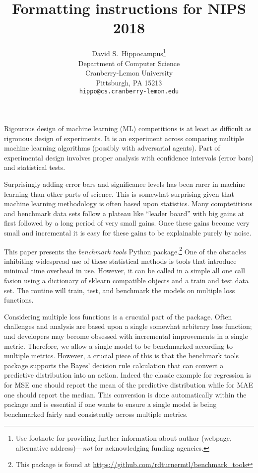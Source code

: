 \documentclass{article}
\title{Formatting instructions for NIPS 2018}
\author{
  David S.~Hippocampus\thanks{Use footnote for providing further
    information about author (webpage, alternative
    address)---\emph{not} for acknowledging funding agencies.} \\
  Department of Computer Science\\
  Cranberry-Lemon University\\
  Pittsburgh, PA 15213 \\
  \texttt{hippo@cs.cranberry-lemon.edu} \\
}
\begin{document}

\maketitle

Rigourous design of machine learning (ML) competitions is at least as difficult as rigrouous design of experiments.
It is an experiment across comparing multiple machine learning algorithms (possibly with adversarial agents)\@.
Part of experimental design involves proper analysis with confidence intervals (error bars) and statistical tests.

Surprisingly adding error bars and significance levels has been rarer in machine learning than other parts of science.
This is somewhat surprising given that machine learning methodology is often based upon statistics.
Many comptetitions and benchmark data sets follow a plateau like ``leader board'' with big gains at first followed by a long period of very small gains.
Once these gains become very small and incremental it is easy for these gains to be explainable purely by noise.

This paper presents the \emph{benchmark tools} Python package.\footnote{This package is found at
\url{https://github.com/rdturnermtl/benchmark_tools}}
One of the obstacles inhibiting widespread use of these statistical methods is tools that introduce minimal time overhead in use.
However, it can be called in a simple all one call fasion using a dictionary of sklearn compatible objects and a train and test data set.
The routine will train, test, and benchmark the models on multiple loss functions.

Considering multiple loss functions is a crucuial part of the package.
Often challenges and analysis are based upon a single somewhat arbitrary loss function; and developers may become obsessed with incremental improvements in a single metric.
Therefore, we allow a single model to be benchmarked according to multiple metrics.
However, a crucial piece of this is that the benchmark tools package supports the Bayes' decision rule calculation that can convert a predictive distribution into an action.
Indeed the classic example for regression is for MSE one should report the mean of the predictive distribution while for MAE one should report the median.
This conversion is done automatically within the package and is essential if one wants to ensure a single model is being benchmarked fairly and consistently across multiple metrics.
\end{document}
